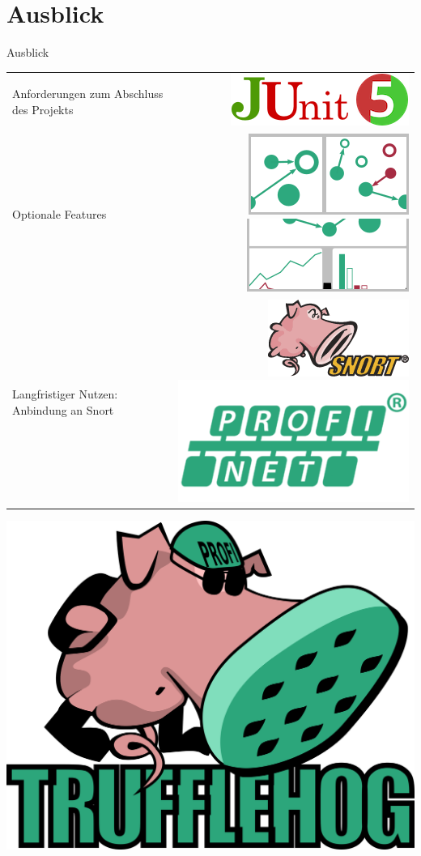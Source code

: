 \documentclass[18pt]{beamer}
\begin{document}
\section{Ausblick}
\begin{frame}{Ausblick}
	\begin{tabular}{m{5cm}r}
		Anforderungen zum Abschluss des Projekts \vspace{0.5cm} & \includegraphics[width=0.3\linewidth]{images/max-junit} \\
		\pause
		Optionale Features \vspace{0.5cm} & \includegraphics[width=0.2\linewidth]{images/max-tiling} \hspace{0.5cm} \includegraphics[width=0.2\linewidth]{images/max-stats} \\
		\pause
		Langfristiger Nutzen: Anbindung an Snort \vspace{0.5cm} & \includegraphics[width=0.2\linewidth]{images/max-snort} \hspace{0.5cm} \includegraphics[width=0.2\linewidth]{images/max-profinet} \\
	\end{tabular}
\end{frame}

\begin{frame}
	\centering
	\includegraphics[width=0.8\linewidth]{images/title}
\end{frame}


\appendix
\beginbackup


\backupend
\end{document}
